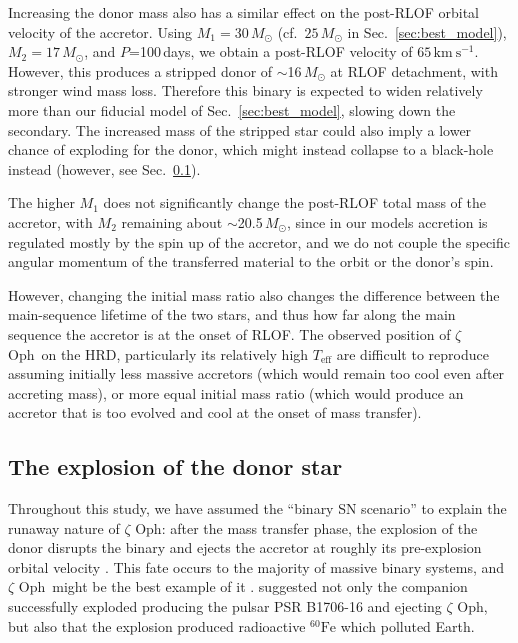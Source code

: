 \documentclass[twocolumn,twocolappendix,trackchanges]{aastex63}
\newcommand{\kms}{{\mathrm{km\ s^{-1}}}}
\DeclareRobustCommand{\Secref}[1]{Sec.~\ref{#1}}
\newcommand{\zoph}{$\zeta$ Oph}
\begin{document}
Increasing the donor mass also has a similar effect on the post-RLOF orbital velocity of the accretor. Using
$M_1=30\,M_\odot$ (cf.\ $25\,M_\odot$ in \Secref{sec:best_model}),
$M_2=17\,M_\odot$, and
$P$=100\,days, we obtain a post-RLOF velocity of
$65\,\kms$. However, this produces a stripped donor of
$\sim$16\,$M_\odot$ at RLOF detachment, with stronger wind mass loss. Therefore this binary is expected to widen relatively more than our fiducial model of \Secref{sec:best_model}, slowing down the secondary. The increased mass of the stripped star could also imply a lower chance of exploding for the donor, which might instead collapse to a black-hole instead (however, see \Secref{sec:SN_comp}).

The higher $M_1$ does not significantly change the post-RLOF total
mass of the accretor, with $M_2$ remaining about $\sim$20.5\,$M_\odot$, since
in our models accretion is regulated mostly by the spin up of the
accretor, and we do not couple the specific angular momentum of the transferred
material to the orbit or the donor's spin.

However, changing the initial mass ratio also changes the difference
between the main-sequence lifetime of the two stars, and thus how far
along the main sequence the accretor is at the onset of RLOF. The observed
position of \zoph\ on the HRD, particularly its relatively high
$T_\mathrm{eff}$ are difficult to reproduce assuming initially less
massive accretors (which would remain too cool even after accreting
mass), or more equal initial mass ratio (which would produce an
accretor that is too evolved and cool at the onset of mass transfer).

\subsection{The explosion of the donor star}
\label{sec:SN_comp}

Throughout this study, we have assumed the ``binary SN scenario'' to
explain the runaway nature of \zoph:
after the mass transfer phase, the explosion of the donor disrupts the
binary and ejects the accretor at roughly its pre-explosion orbital
velocity \citep[e.g.,][]{renzo:19walk}. This fate occurs to the
majority of massive binary systems, and \zoph\ might be the best
example of it \citep[e.g.,][]{blaauw:52, blaauw:61,
  hoogerwerf:00}. \cite{neuhauser:20} suggested not only the companion
successfully exploded producing the pulsar PSR B1706-16 and ejecting
\zoph, but also that the
explosion produced radioactive $^{60}\mathrm{Fe}$ which polluted
Earth.
\end{document}
